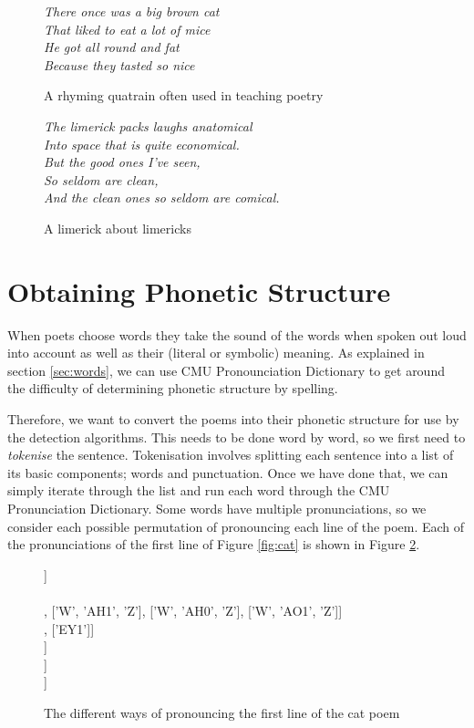 \begin{figure}
\centering
\begin{minipage}{0.45\textwidth}
\centering
\textit{
There once was a big brown cat\\
That liked to eat a lot of mice\\
He got all round and fat\\
Because they tasted so nice
}
\caption{A rhyming quatrain often used in teaching poetry}
\label{fig:cat}
\end{minipage}\hfill
\begin{minipage}{0.45\textwidth}
\centering
\textit{
The limerick packs laughs anatomical\\
Into space that is quite economical.\\
    But the good ones I've seen,\\
    So seldom are clean,\\
And the clean ones so seldom are comical.
}
\caption{A limerick about limericks}
\label{fig:limerick}
\end{minipage}
\end{figure}


\section{Obtaining Phonetic Structure}

When poets choose words they take the sound of the words when spoken out loud into account as well as their (literal or symbolic) meaning. As explained in section \ref{sec:words}, we can use CMU Pronounciation Dictionary to get around the difficulty of determining phonetic structure by spelling.

Therefore, we want to convert the poems into their phonetic structure for use by the detection algorithms. This needs to be done word by word, so we first need to \textit{tokenise} the sentence. Tokenisation involves splitting each sentence into a list of its basic components; words and punctuation. Once we have done that, we can simply iterate through the list and run each word through the CMU Pronunciation Dictionary. Some words have multiple pronunciations, so we consider each possible permutation of pronouncing each line of the poem. Each of the pronunciations of the first line of Figure \ref{fig:cat} is shown in Figure \ref{fig:catpronun}.

\begin{figure}
\centering
[['DH', 'EH1', 'R']] \\
['W', 'AH1', 'N', 'S']\\
[['W', 'AA1', 'Z'], ['W', 'AH1', 'Z'], ['W', 'AH0', 'Z'], ['W', 'AO1', 'Z']]\\
[['AH0'], ['EY1']]\\
[['B', 'IH1', 'G']]\\
[['B', 'R', 'AW1', 'N']]\\
[['K', 'AE1', 'T']]
\caption{The different ways of pronouncing the first line of the cat poem}
\label{fig:catpronun}
\end{figure}


